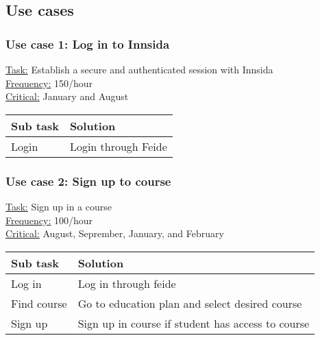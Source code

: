 \subsection{Use cases}

\subsubsection*{Use case 1: Log in to Innsida}

\underline{Task:} Establish a secure and authenticated session with Innsida\\
\underline{Frequency:} 150/hour\\
\underline{Critical:} January and August 

\begin{tabularx}{\textwidth}{|l|X|}
  \hline
  Sub task & Solution \\ \hline
  Login & Login through Feide \\ \hline
\end{tabularx}

\subsubsection*{Use case 2: Sign up to course}

\underline{Task:} Sign up in a course\\
\underline{Frequency:} 100/hour\\
\underline{Critical:} August, Seprember, January, and February

\begin{tabularx}{\textwidth}{|l|X|}
  \hline
  Sub task & Solution \\ \hline
  Log in & Log in through feide \\ \hline
  Find course & Go to education plan and select desired course \\ \hline
  Sign up & Sign up in course if student has access to course \\ \hline
\end{tabularx}
